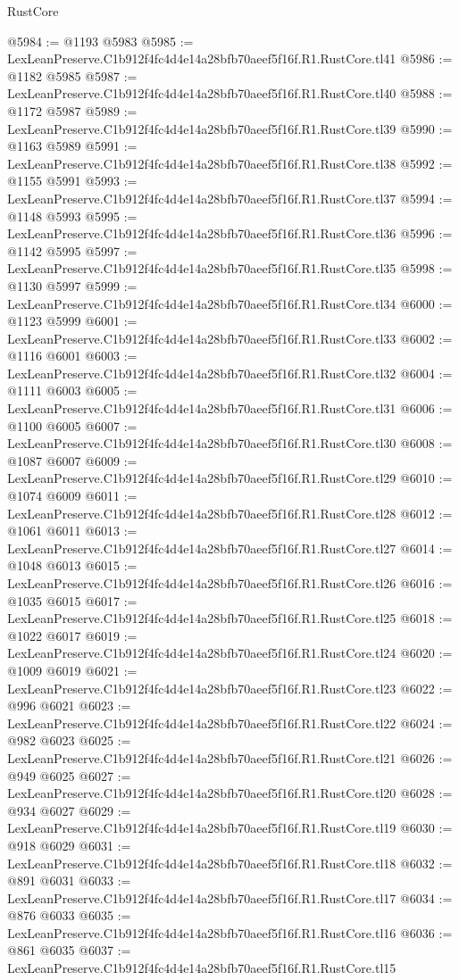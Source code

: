 \begin{lexlean}{RustCore}
\begin{coremodule}
@5984 := @1193 @5983
@5985 := LexLeanPreserve.C1b912f4fc4d4e14a28bfb70aeef5f16f.R1.RustCore.tl41
@5986 := @1182 @5985
@5987 := LexLeanPreserve.C1b912f4fc4d4e14a28bfb70aeef5f16f.R1.RustCore.tl40
@5988 := @1172 @5987
@5989 := LexLeanPreserve.C1b912f4fc4d4e14a28bfb70aeef5f16f.R1.RustCore.tl39
@5990 := @1163 @5989
@5991 := LexLeanPreserve.C1b912f4fc4d4e14a28bfb70aeef5f16f.R1.RustCore.tl38
@5992 := @1155 @5991
@5993 := LexLeanPreserve.C1b912f4fc4d4e14a28bfb70aeef5f16f.R1.RustCore.tl37
@5994 := @1148 @5993
@5995 := LexLeanPreserve.C1b912f4fc4d4e14a28bfb70aeef5f16f.R1.RustCore.tl36
@5996 := @1142 @5995
@5997 := LexLeanPreserve.C1b912f4fc4d4e14a28bfb70aeef5f16f.R1.RustCore.tl35
@5998 := @1130 @5997
@5999 := LexLeanPreserve.C1b912f4fc4d4e14a28bfb70aeef5f16f.R1.RustCore.tl34
@6000 := @1123 @5999
@6001 := LexLeanPreserve.C1b912f4fc4d4e14a28bfb70aeef5f16f.R1.RustCore.tl33
@6002 := @1116 @6001
@6003 := LexLeanPreserve.C1b912f4fc4d4e14a28bfb70aeef5f16f.R1.RustCore.tl32
@6004 := @1111 @6003
@6005 := LexLeanPreserve.C1b912f4fc4d4e14a28bfb70aeef5f16f.R1.RustCore.tl31
@6006 := @1100 @6005
@6007 := LexLeanPreserve.C1b912f4fc4d4e14a28bfb70aeef5f16f.R1.RustCore.tl30
@6008 := @1087 @6007
@6009 := LexLeanPreserve.C1b912f4fc4d4e14a28bfb70aeef5f16f.R1.RustCore.tl29
@6010 := @1074 @6009
@6011 := LexLeanPreserve.C1b912f4fc4d4e14a28bfb70aeef5f16f.R1.RustCore.tl28
@6012 := @1061 @6011
@6013 := LexLeanPreserve.C1b912f4fc4d4e14a28bfb70aeef5f16f.R1.RustCore.tl27
@6014 := @1048 @6013
@6015 := LexLeanPreserve.C1b912f4fc4d4e14a28bfb70aeef5f16f.R1.RustCore.tl26
@6016 := @1035 @6015
@6017 := LexLeanPreserve.C1b912f4fc4d4e14a28bfb70aeef5f16f.R1.RustCore.tl25
@6018 := @1022 @6017
@6019 := LexLeanPreserve.C1b912f4fc4d4e14a28bfb70aeef5f16f.R1.RustCore.tl24
@6020 := @1009 @6019
@6021 := LexLeanPreserve.C1b912f4fc4d4e14a28bfb70aeef5f16f.R1.RustCore.tl23
@6022 := @996 @6021
@6023 := LexLeanPreserve.C1b912f4fc4d4e14a28bfb70aeef5f16f.R1.RustCore.tl22
@6024 := @982 @6023
@6025 := LexLeanPreserve.C1b912f4fc4d4e14a28bfb70aeef5f16f.R1.RustCore.tl21
@6026 := @949 @6025
@6027 := LexLeanPreserve.C1b912f4fc4d4e14a28bfb70aeef5f16f.R1.RustCore.tl20
@6028 := @934 @6027
@6029 := LexLeanPreserve.C1b912f4fc4d4e14a28bfb70aeef5f16f.R1.RustCore.tl19
@6030 := @918 @6029
@6031 := LexLeanPreserve.C1b912f4fc4d4e14a28bfb70aeef5f16f.R1.RustCore.tl18
@6032 := @891 @6031
@6033 := LexLeanPreserve.C1b912f4fc4d4e14a28bfb70aeef5f16f.R1.RustCore.tl17
@6034 := @876 @6033
@6035 := LexLeanPreserve.C1b912f4fc4d4e14a28bfb70aeef5f16f.R1.RustCore.tl16
@6036 := @861 @6035
@6037 := LexLeanPreserve.C1b912f4fc4d4e14a28bfb70aeef5f16f.R1.RustCore.tl15

\end{coremodule}
\end{lexlean}
